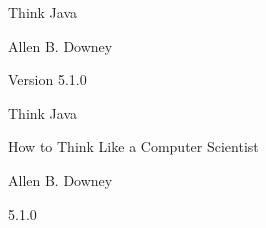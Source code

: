 \documentclass[12pt]{book}
\title{\thetitle}
\author{Allen B. Downey}
\newcommand{\theversion}{5.1.0}
\theoremstyle{exercise}
\begin{document}
\frontmatter


\begin{htmlonly}


{\Large Think Java}

{\large Allen B. Downey}

Version \theversion

\setcounter{chapter}{-1}

\end{htmlonly}




\begin{latexonly}


%
%
%
%
%
%



\pagebreak
\thispagestyle{empty}

\begin{flushright}
\vspace*{2.5in}

{\huge Think Java}

\vspace{0.25in}

{\LARGE How to Think Like a Computer Scientist}

\vspace{1in}

{\Large
Allen B. Downey
}


\vspace{1in}

{\Large \theversion}

\vfill

\end{flushright}


\pagebreak
\thispagestyle{empty}


\end{latexonly}
\end{document}
